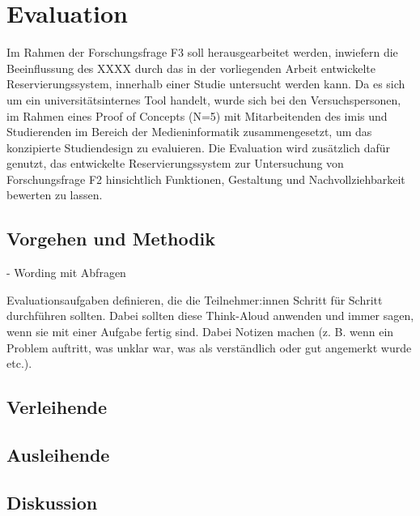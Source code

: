 
\chapter{Evaluation}
\label{chapter-evaluation}
Im Rahmen der Forschungsfrage F3 soll herausgearbeitet werden, inwiefern die Beeinflussung des XXXX
durch das in der vorliegenden Arbeit entwickelte Reservierungssystem, innerhalb einer Studie
untersucht werden kann. Da es sich um ein universitätsinternes Tool handelt, wurde sich bei den
Versuchspersonen, im Rahmen eines Proof of Concepts (N=5) mit Mitarbeitenden des \ac{imis} und
Studierenden im Bereich der Medieninformatik zusammengesetzt, um das konzipierte Studiendesign
zu evaluieren. Die Evaluation wird zusätzlich dafür genutzt, das entwickelte Reservierungssystem zur
Untersuchung von Forschungsfrage F2 hinsichtlich Funktionen, Gestaltung und
Nachvollziehbarkeit bewerten zu lassen.


\section{Vorgehen und Methodik}
- Wording mit Abfragen


Evaluationsaufgaben definieren, die die Teilnehmer:innen Schritt für Schritt durchführen sollten.
Dabei sollten diese Think-Aloud anwenden und immer sagen, wenn sie mit einer Aufgabe fertig sind.
Dabei Notizen machen (z. B. wenn ein Problem auftritt, was unklar war, was als verständlich oder gut
angemerkt wurde etc.).


\section{Verleihende}

\section{Ausleihende}


\section{Diskussion}